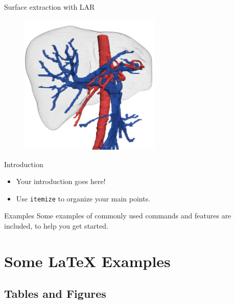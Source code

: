 \documentclass{beamer}
\begin{document}
\begin{frame}{Surface extraction with LAR}
\begin{figure}
    \centering
            \includegraphics[width=0.6\textwidth]{figs/ircad01_liver_tricolore_01.png}
\end{figure}
    
\end{frame}



\begin{frame}{Introduction}

\begin{itemize}
  \item Your introduction goes here!
  \item Use \texttt{itemize} to organize your main points.
\end{itemize}

\vskip 1cm

\begin{block}{Examples}
Some examples of commonly used commands and features are included, to help you get started.
\end{block}

\end{frame}

\section{Some \LaTeX{} Examples}

\subsection{Tables and Figures}
\end{document}
